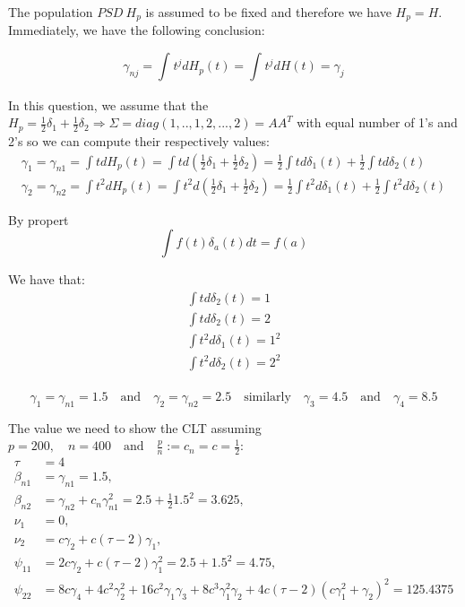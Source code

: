 \documentclass[
]{article}
\begin{document}
The population \(PSD \ H_p\) is assumed to be fixed and therefore we
have \(H_p = H\). Immediately, we have the following conclusion:

\[
\gamma_{nj} = \int_{} t^jdH_p(t) = \int_{} t^jdH(t) = \gamma_j
\]

In this question, we assume that the
\(H_p = \frac{1}{2} \delta_1 + \frac{1}{2} \delta_2 \Rightarrow \Sigma = diag(1,..,1,2,...,2)=AA^T\)
with equal number of 1's and 2's so we can compute their respectively
values: \begin{align*}
\gamma_1 = \gamma_{n1} = \int t dH_p(t) = \int t d(\frac{1}{2}\delta_1 + \frac{1}{2}\delta_2) = \frac{1}{2} \int t d\delta_1(t) + \frac{1}{2} \int t d \delta_2(t) \\
\gamma_2 = \gamma_{n2} = \int t^2 dH_p(t) = \int t^2 d(\frac{1}{2}\delta_1 + \frac{1}{2}\delta_2) = \frac{1}{2} \int t^2 d\delta_1(t) + \frac{1}{2} \int t^2 d \delta_2(t)
\end{align*}

By propert \begin{equation*}
\int f(t) \delta_a(t)dt = f(a) \tag{1}
\end{equation*}

We have that: \begin{align*}
\int t d \delta_2(t) = 1\\
\int t d \delta_2(t) = 2\\
\int t^2 d\delta_1(t) = 1^2\\
\int t^2 d\delta_2(t) = 2^2\\
\end{align*}

\[
\gamma_1  = \gamma_{n1} = 1.5 \quad \text{and} \quad \gamma_2 = \gamma_{n2} =2.5 \quad \text{similarly} \quad \gamma_3 = 4.5 \quad \text{and} \quad \gamma_4 = 8.5
\]

The value we need to show the CLT assuming
\(p = 200, \quad n = 400 \quad \text{and} \quad \frac{p}{n} :=c_n = c = \frac{1}{2}\):
\begin{align*}
\tau & = 4\\
\beta_{n1} & = \gamma_{n1} = 1.5, \\
\beta_{n2} & = \gamma_{n2} + c_n\gamma^2_{n1} = 2.5 + \frac{1}{2} 1.5^2 = 3.625, \\
\nu_1 &= 0, \\
\nu_2 &= c\gamma_2 + c(\tau - 2)\gamma_1, \\
\psi_{11} & = 2c\gamma_2 + c(\tau - 2)\gamma^2_1 =  2.5 + 1.5^2 = 4.75, \\
\psi_{22} & = 8c\gamma_4 + 4c^2\gamma^2_2 + 16c^2\gamma_1\gamma_3 + 8c^3\gamma^2_1 \gamma_2 + 4c(\tau - 2)(c\gamma^2_1 + \gamma_2)^2 = 125.4375
\end{align*}
\end{document}

